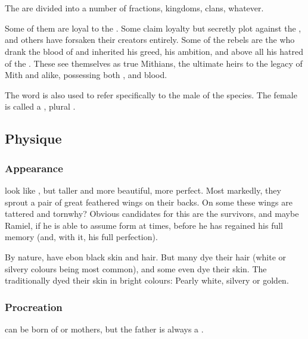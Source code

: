 \section{\Resphain}
\label{\resphain}
\label{\resphain{}}
The \resphain{} are divided into a number of fractions, kingdoms, clans, whatever. 

Some of them are loyal to the \banes. Some claim loyalty but secretly plot against the \banes, and others have forsaken their creators entirely. Some of the rebels are the \bloodresphain{} who drank the blood of \Astorglax{} and inherited his greed, his ambition, and above all his hatred of the \banes. These \resphain{} see themselves as true Mithians, the ultimate heirs to the legacy of Mith and \Erebos{} alike, possessing both \nephilic, \draconic{} and \bane{} blood. 

The word \quo{\resphan} is also used to refer specifically to the male of the species. The female is called a \resvil, plural \resviel. 







\subsection{Physique}
\subsubsection{Appearance}
\Resphain{} look like \humans, but taller and more beautiful, more perfect. Most markedly, they sprout a pair of great feathered wings on their backs. On some \resphain{} these wings are tattered and torn\dash why? Obvious candidates for this are the \Kezeradi{} survivors, and maybe Ramiel, if he is able to assume \resphan{} form at times, before he has regained his full memory (and, with it, his full perfection). 

By nature, \resphain{} have ebon black skin and hair. But many dye their hair (white or silvery colours being most common), and some even dye their skin. The \Kezeradi{} traditionally dyed their skin in bright colours: Pearly white, silvery or golden. 





\subsubsection{Procreation}
\Resphain{} can be born of \resvil{} or \human{} mothers, but the father is always a \resphan. 

